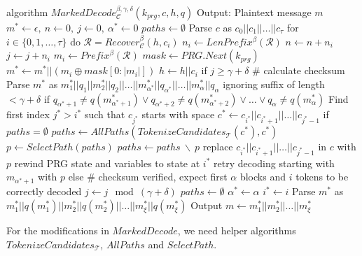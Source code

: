 \begin{Pseudocode}[caption={
$MarkedDecode$ algorithm.
In comparison to Meteor's $Decode$ algorithm, $MarkedDecode$ verifies the checksums $q(m_i)$ of blocks $m_i$.
If the checksum does not match, a decoding error occured.
It then performs a lookbehind on the stegotext and generates all possible tokenizations $paths$ for a substring of $c$.
Afterwards, rewind the internal state and retry decoding with a path $p$ selected from $paths$.
}, label={alg:marked-decode}]
algorithm $MarkedDecode_{\mathcal{C}}^{\beta,\gamma,\delta}(k_{prg}, c, h, q)$
  Output: Plaintext message $m$
  $m^* \leftarrow \epsilon,~ n \leftarrow 0,~ j \leftarrow 0,~ \alpha^* \leftarrow 0$
  $paths \leftarrow \emptyset$
  Parse $c$ as $c_0 || c_1 || \dots || c_{\tau}$
  for $i \in \{ 0, 1, \dots, \tau \}$ do
    $\mathcal{R} = Recover_{\mathcal{C}}^\beta(h, c_i)$
    $n_i \leftarrow LenPrefix^\beta(\mathcal{R})$
    $n \leftarrow n + n_i$
    $j \leftarrow j + n_i$
    $m_i \leftarrow Prefix^\beta(\mathcal{R})$
    $mask \leftarrow PRG.Next(k_{prg})$
    $m^* \leftarrow m^* || (m_i \oplus mask[0: |m_i|])$
    $h \leftarrow h||c_i$
    if $j \geq \gamma + \delta$
      # calculate checksum
      Parse $m^*$ as $m^*_1||q_1||m^*_2||q_2||\dots||m^*_{\alpha^*}||q_{\alpha^*}||\dots||m^*_\alpha||q_\alpha$ ignoring suffix of length $< \gamma+\delta$
      if $q_{\alpha^*+1} \neq q(m^*_{\alpha^*+1}) \lor q_{\alpha^*+2} \neq q(m^*_{\alpha^*+2}) \lor \dots \lor q_\alpha \neq q(m^*_\alpha)$
        Find first index $j^* > i^*$ such that $c_{j^*}$ starts with space
        $c^* \leftarrow c_{i^*} || c_{i^*+1} || \dots || c_{j^*-1}$
        if $paths = \emptyset$
          $paths \leftarrow AllPaths(TokenizeCandidates_{\mathcal{T}}(c^*), c^*)$
        $p \leftarrow SelectPath(paths)$
        $paths \leftarrow paths~ \backslash~ p$
        replace $c_{i^*}||c_{i^*+1}||\dots||c_{j^*-1}$ in $c$ with $p$
        rewind PRG state and variables to state at $i^*$
        retry decoding starting with $m_{\alpha^*+1}$ with $p$
      else  # checksum verified, expect first $\alpha$ blocks and $i$ tokens to be correctly decoded
        $j \leftarrow j \mod (\gamma+\delta)$
        $paths \leftarrow \emptyset$
        $\alpha^* \leftarrow \alpha$
        $i^* \leftarrow i$
  Parse $m^*$ as $m^*_1||q(m^*_1)||m^*_2||q(m^*_2)||\dots||m^*_\xi||q(m^*_\xi)$
  Output $m \leftarrow m^*_1||m^*_2||\dots||m^*_\xi$
\end{Pseudocode}

For the modifications in $MarkedDecode$, we need helper algorithms $TokenizeCandidates_{\mathcal{T}}$, $AllPaths$ and $SelectPath$.

